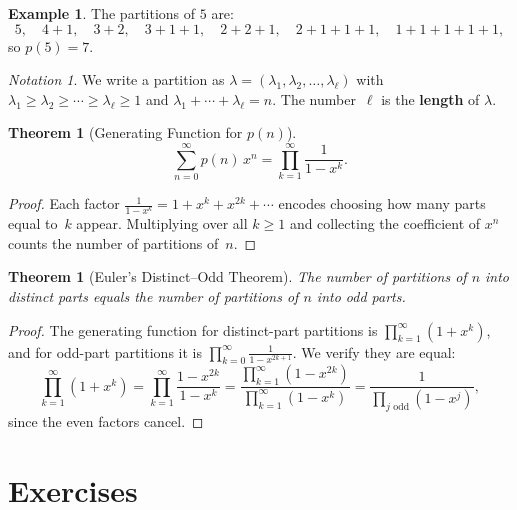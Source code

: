 \documentclass[12pt,a4paper,openany]{book}
\theoremstyle{definition}
\newtheorem{example}[definition]{Example}
\theoremstyle{plain}
\newtheorem{theorem}[definition]{Theorem}
\theoremstyle{remark}
\newtheorem{notation}[definition]{Notation}
\begin{document}
\begin{example}\label{ex:partitions-5}
The partitions of $5$ are:
\[
  5, \quad 4+1, \quad 3+2, \quad 3+1+1, \quad 2+2+1, \quad 2+1+1+1,
  \quad 1+1+1+1+1,
\]
so $p(5) = 7$.
\end{example}

\begin{notation}\label{not:partition-lambda}
We write a partition as $\lambda = (\lambda_1, \lambda_2, \dots,
\lambda_\ell)$ with $\lambda_1 \ge \lambda_2 \ge \cdots \ge
\lambda_\ell \ge 1$ and $\lambda_1 + \cdots + \lambda_\ell = n$.  The
number~$\ell$ is the \textbf{length} of
$\lambda$.
\end{notation}

\begin{theorem}[Generating Function for $p(n)$]\label{thm:partition-gf}
\[
  \sum_{n=0}^{\infty} p(n)\,x^n
  = \prod_{k=1}^{\infty} \frac{1}{1-x^k}.
\]
\end{theorem}

\begin{proof}
Each factor $\frac{1}{1-x^k} = 1 + x^k + x^{2k} + \cdots$ encodes
choosing how many parts equal to~$k$ appear.  Multiplying over all
$k \ge 1$ and collecting the coefficient of $x^n$ counts the number
of partitions of~$n$.
\end{proof}

\begin{theorem}[Euler's Distinct--Odd Theorem]\label{thm:euler-distinct-odd}
The number of partitions of $n$ into \emph{distinct} parts equals
the number of partitions of $n$ into \emph{odd} parts.
\end{theorem}

\begin{proof}
The generating function for distinct-part partitions is
$\prod_{k=1}^{\infty}(1+x^k)$, and for odd-part partitions it is
$\prod_{k=0}^{\infty}\frac{1}{1-x^{2k+1}}$.  We verify they are equal:
\[
  \prod_{k=1}^{\infty}(1+x^k)
  = \prod_{k=1}^{\infty}\frac{1-x^{2k}}{1-x^k}
  = \frac{\prod_{k=1}^{\infty}(1-x^{2k})}{\prod_{k=1}^{\infty}(1-x^k)}
  = \frac{1}{\prod_{j\text{ odd}}(1-x^j)},
\]
since the even factors cancel.
\end{proof}



\section{Exercises}\label{sec:ie-exercises}
\end{document}
